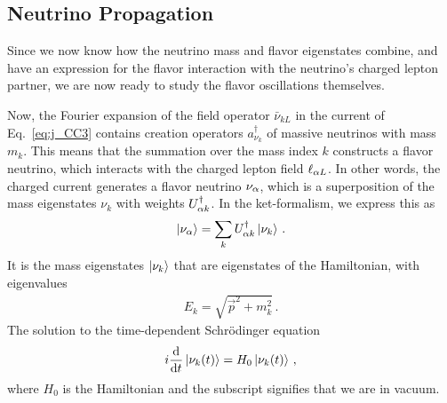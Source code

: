 \subsection{Neutrino Propagation}
Since we now know how the neutrino mass and flavor eigenstates combine, and have an expression for the flavor interaction with 
the neutrino's charged lepton partner, we are now ready to study the flavor oscillations themselves.

Now, the Fourier expansion of the field operator $\bar{\nu}_{k L}$ in the current of Eq.~\ref{eq:j_CC3} contains creation operators $a^\dagger_{\nu_k}$
of massive neutrinos with mass $m_k$. This means that the summation over the mass index $k$ constructs a flavor neutrino, which interacts with the charged lepton field $\ell_{\alpha L}$.
In other words, the charged current generates a flavor neutrino $\nu_\alpha$, which is a superposition of the mass eigenstates 
$\nu_k$ with weights $U_{\alpha k}^\dagger$. In the ket-formalism, we express this as
\begin{align}\label{eq:osc_1}
    \ket{\nu_\alpha} = \sum_k U^\dagger_{\alpha k} \ket{\nu_k}\,.
\end{align}
It is the mass eigenstates $\ket{\nu_k}$ that are eigenstates of the Hamiltonian, with eigenvalues
\begin{align}\label{eq:disp}
    E_k = \sqrt{\vec{p}^2 + m_k^2}\,.
\end{align}
The solution to the time-dependent Schrödinger equation 
\begin{align}\label{eq:TDSE}
    i \dv{}{t} \ket{\nu_k(t)} = H_0\ket{\nu_k(t)}\,,
\end{align}
where $H_0$ is the Hamiltonian and the subscript signifies that we are in vacuum. 

